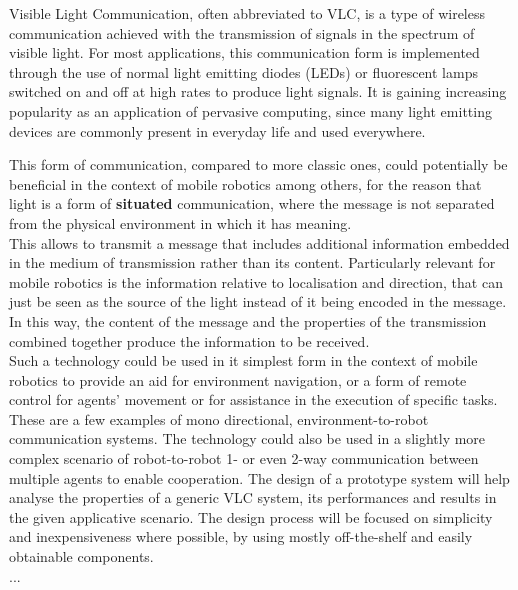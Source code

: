 

Visible Light Communication, often abbreviated to VLC, is a type of wireless communication achieved with the transmission of signals in the spectrum of visible light.
For most applications, this communication form is implemented through the use of  normal light emitting diodes (LEDs) or fluorescent lamps switched on and off at high rates to produce light signals.
It is gaining increasing popularity as an application of pervasive computing, since many light emitting devices are commonly present in everyday life and used everywhere.

This form of communication, compared to more classic ones, could potentially be beneficial in the context of mobile robotics among others, for the reason that light is a form of \textbf{situated} communication, where the message is not separated from the physical environment in which it has meaning.\\
This allows to transmit a message that includes additional information embedded in the medium of transmission rather than its content.
Particularly relevant for mobile robotics is the information relative to localisation and direction, that can just be seen as the source of the light instead of it being encoded in the message.
In this way, the content of the message and the properties of the transmission combined together produce the information to be received. \\
Such a technology could be used in it simplest form in the context of mobile robotics to provide an aid for environment navigation, or a form of remote control for agents' movement or for assistance in the execution of specific tasks. 
These are a few examples of mono directional, environment-to-robot communication systems.
The technology could also be used in a slightly more complex scenario of robot-to-robot 1- or even 2-way communication between multiple agents to enable cooperation.
The design of a prototype system will help analyse the properties of a generic VLC system, its performances and results in the given applicative scenario.
The design process will be focused on simplicity and inexpensiveness where possible, by using mostly off-the-shelf and easily obtainable components.\\
...\\

